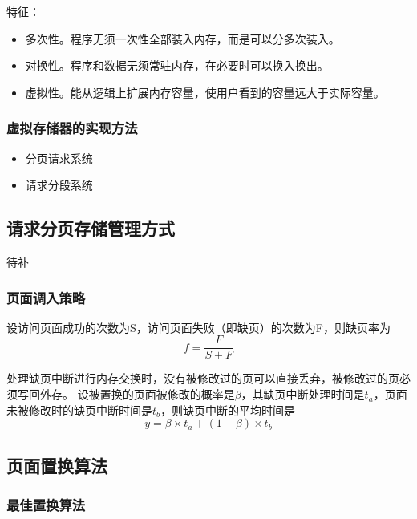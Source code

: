 \documentclass[12pt, a4paper, oneside]{ctexart}
\begin{document}
特征：
\begin{itemize}
    \item 多次性。程序无须一次性全部装入内存，而是可以分多次装入。
    \item 对换性。程序和数据无须常驻内存，在必要时可以换入换出。
    \item 虚拟性。能从逻辑上扩展内存容量，使用户看到的容量远大于实际容量。
\end{itemize}

\subsubsection{虚拟存储器的实现方法}

\begin{itemize}
    \item 分页请求系统
    \item 请求分段系统
\end{itemize}

\subsection{请求分页存储管理方式}

待补

\subsubsection{页面调入策略}

设访问页面成功的次数为S，访问页面失败（即缺页）的次数为F，则缺页率为
\begin{equation}
    f=\frac{F}{S+F}
\end{equation}

处理缺页中断进行内存交换时，没有被修改过的页可以直接丢弃，被修改过的页必须写回外存。
设被置换的页面被修改的概率是$\beta$，其缺页中断处理时间是$t_a$，页面未被修改时的缺页中断时间是$t_b$，则缺页中断的平均时间是
\begin{equation}
    y=\beta\times t_a+(1-\beta)\times t_b
\end{equation}

\subsection{页面置换算法}

\subsubsection{最佳置换算法}
\end{document}
